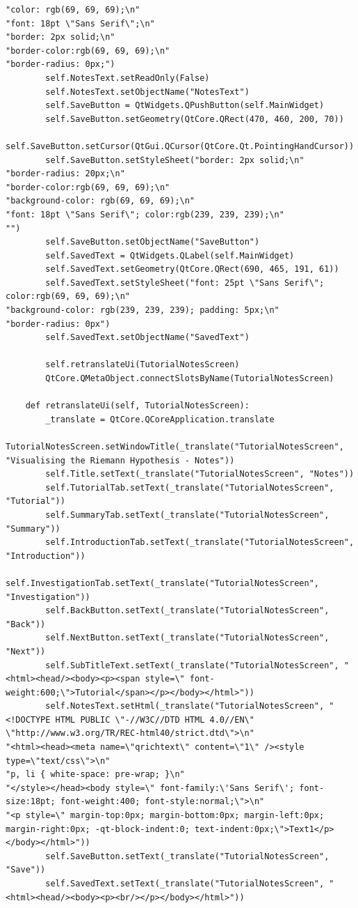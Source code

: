 \documentclass{article}
\begin{document}
\begin{lstlisting}
"color: rgb(69, 69, 69);\n"
"font: 18pt \"Sans Serif\";\n"
"border: 2px solid;\n"
"border-color:rgb(69, 69, 69);\n"
"border-radius: 0px;")
        self.NotesText.setReadOnly(False)
        self.NotesText.setObjectName("NotesText")
        self.SaveButton = QtWidgets.QPushButton(self.MainWidget)
        self.SaveButton.setGeometry(QtCore.QRect(470, 460, 200, 70))
        self.SaveButton.setCursor(QtGui.QCursor(QtCore.Qt.PointingHandCursor))
        self.SaveButton.setStyleSheet("border: 2px solid;\n"
"border-radius: 20px;\n"
"border-color:rgb(69, 69, 69);\n"
"background-color: rgb(69, 69, 69);\n"
"font: 18pt \"Sans Serif\"; color:rgb(239, 239, 239);\n"
"")
        self.SaveButton.setObjectName("SaveButton")
        self.SavedText = QtWidgets.QLabel(self.MainWidget)
        self.SavedText.setGeometry(QtCore.QRect(690, 465, 191, 61))
        self.SavedText.setStyleSheet("font: 25pt \"Sans Serif\"; color:rgb(69, 69, 69);\n"
"background-color: rgb(239, 239, 239); padding: 5px;\n"
"border-radius: 0px")
        self.SavedText.setObjectName("SavedText")

        self.retranslateUi(TutorialNotesScreen)
        QtCore.QMetaObject.connectSlotsByName(TutorialNotesScreen)

    def retranslateUi(self, TutorialNotesScreen):
        _translate = QtCore.QCoreApplication.translate
        TutorialNotesScreen.setWindowTitle(_translate("TutorialNotesScreen", "Visualising the Riemann Hypothesis - Notes"))
        self.Title.setText(_translate("TutorialNotesScreen", "Notes"))
        self.TutorialTab.setText(_translate("TutorialNotesScreen", "Tutorial"))
        self.SummaryTab.setText(_translate("TutorialNotesScreen", "Summary"))
        self.IntroductionTab.setText(_translate("TutorialNotesScreen", "Introduction"))
        self.InvestigationTab.setText(_translate("TutorialNotesScreen", "Investigation"))
        self.BackButton.setText(_translate("TutorialNotesScreen", "Back"))
        self.NextButton.setText(_translate("TutorialNotesScreen", "Next"))
        self.SubTitleText.setText(_translate("TutorialNotesScreen", "<html><head/><body><p><span style=\" font-weight:600;\">Tutorial</span></p></body></html>"))
        self.NotesText.setHtml(_translate("TutorialNotesScreen", "<!DOCTYPE HTML PUBLIC \"-//W3C//DTD HTML 4.0//EN\" \"http://www.w3.org/TR/REC-html40/strict.dtd\">\n"
"<html><head><meta name=\"qrichtext\" content=\"1\" /><style type=\"text/css\">\n"
"p, li { white-space: pre-wrap; }\n"
"</style></head><body style=\" font-family:\'Sans Serif\'; font-size:18pt; font-weight:400; font-style:normal;\">\n"
"<p style=\" margin-top:0px; margin-bottom:0px; margin-left:0px; margin-right:0px; -qt-block-indent:0; text-indent:0px;\">Text1</p></body></html>"))
        self.SaveButton.setText(_translate("TutorialNotesScreen", "Save"))
        self.SavedText.setText(_translate("TutorialNotesScreen", "<html><head/><body><p><br/></p></body></html>"))
\end{lstlisting}
\end{document}
